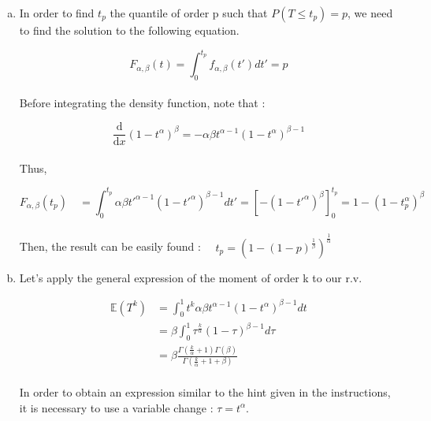 \documentclass[a4paper]{article}
\begin{document}
\begin{enumerate}[(a)]

\item In order to find $t_{p}$ the quantile of order p such that $ P(T \leq t_{p}) = p $, we need to find the solution to the following equation.

$$F_{\alpha , \beta}(t) = \int_{0}^{t_{p}} f_{\alpha , \beta}(t') dt' = p $$
\\
Before integrating the density function, note that :

$$ \frac{\mathrm{d} }{\mathrm{d} x} (1-t^\alpha)^\beta = - \alpha \beta t^{\alpha-1} (1-t^\alpha)^{\beta -1}$$
\\
Thus,

$$F_{\alpha , \beta} (t_p) \quad = \int_{0}^{t_{p}} \alpha \beta t'^{\alpha-1} (1-t'^\alpha)^{\beta -1} dt' = \left [  -(1-t'^\alpha)^\beta \right ]^{t_{p}}_{0} = 1-(1-t_{p}^{\alpha})^\beta$$
\\
Then, the result can be easily found : $\quad t_p = (1-(1-p)^{\frac{1}{\beta}})^{\frac{1}{\alpha}}$

\item Let's apply the general expression of the moment of order k to our r.v.

\nonumber
\begin{equation} \label{eq1}
\begin{split}
\mathbb{E}(T^k) & = \int_{0}^{1} t^k \alpha \beta t^{\alpha -1} (1-t^\alpha)^{\beta-1} dt \\
 & = \beta \int_{0}^{1} \tau^{\frac{k}{\alpha}} (1-\tau)^{\beta -1} d\tau \\
 & = \beta \frac{\Gamma(\frac{k}{\alpha}+1)\Gamma(\beta)}{\Gamma(\frac{k}{\alpha}+1+\beta)}
\end{split}
\end{equation}
\\
In order to obtain an expression similar to the hint given in the instructions, it is necessary to use a variable change : $\tau = t^\alpha$.


\end{enumerate}
\end{document}
